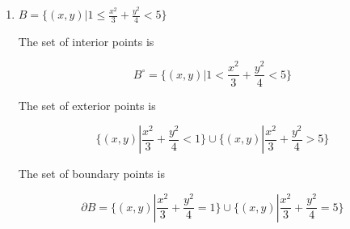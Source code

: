 \documentclass{article}
\begin{document}
\begin{enumerate}[(1)]
        \item $B = \{  (x, y) | 1 \leq \frac{x^2}{3} + \frac{y^2}{4} < 5 \}$

        The set of interior points is

        $$B^\circ = \{ (x, y) | 1 < \frac{x^2}{3} + \frac{y^2}{4} < 5 \}$$

        The set of exterior points is

        $$\{  (x, y) | \frac{x^2}{3} + \frac{y^2}{4} < 1 \} \cup \{  (x, y) | \frac{x^2}{3} + \frac{y^2}{4} > 5 \}$$

        The set of boundary points is

        $$\partial B = \{  (x, y) | \frac{x^2}{3} + \frac{y^2}{4} = 1 \} \cup \{  (x, y) | \frac{x^2}{3} + \frac{y^2}{4} = 5 \}$$

    \end{enumerate}
\end{document}
